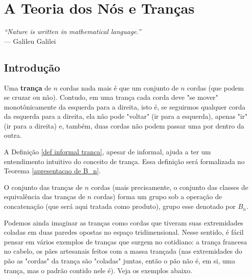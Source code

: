 \chapter[A Teoria dos Nós e Tranças]{A Teoria dos Nós e Tranças}
\label{cap-3}
\chaptermark{}
%
\hfill%
\begin{minipage}{10cm}
\begin{flushright}
\rightskip=0.5cm
\textit{``Nature is written in mathematical language.''}
\\[0.1cm]
\rightskip=0.5cm
--- Galileu Galilei
\end{flushright}
\end{minipage}

\section{Introdução}

\begin{deff}
		\label{def informal tranca}
		Uma \textbf{trança} de $n$ cordas nada mais é que um conjunto de $n$ cordas (que podem se cruzar ou não). Contudo, em uma trança cada corda deve "se mover" monotônicamente da esquerda para a direita, isto é, se seguirmos qualquer corda da esquerda para a direita, ela não pode "voltar" (ir para a esquerda), apenas "ir" (ir para a direita) e, também, duas cordas não podem passar uma por dentro da outra.
	\end{deff}
	
	\par\vspace{0.3cm} A Definição \eqref{def informal tranca}, apesar de informal, ajuda a ter um entendimento intuitivo do conceito de trança. Essa definição será formalizada no Teorema \eqref{apresentacao de B_n}.
	
	\par\vspace{0.3cm} O conjunto das tranças de $n$ cordas (mais precisamente, o conjunto das classes de equivalência das tranças de $n$ cordas) forma um grupo sob a operação de concatenação (que será aqui tratada como produto), grupo esse denotado por $B_n$. 
	\par\vspace{0.3cm} Podemos ainda imaginar as tranças como cordas que tiveram suas extremidades coladas em duas paredes opostas no espaço tridimensional. Nesse sentido, é fácil pensar em vários exemplos de tranças que surgem no cotidiano: a trança francesa no cabelo, os pães artesanais feitos com a massa trançada (nas extremidades do pão as "cordas" da trança são "coladas" juntas, então o pão não é, em si, uma trança, mas o padrão contido nele é). Veja os exemplos abaixo.
	
